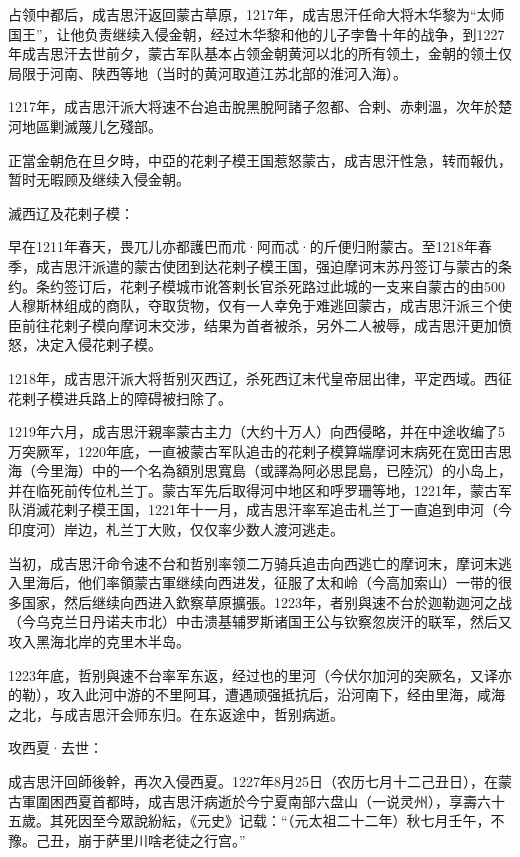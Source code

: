 占领中都后，成吉思汗返回蒙古草原，1217年，成吉思汗任命大将木华黎为“太师国王”，让他负责继续入侵金朝，经过木华黎和他的儿子孛鲁十年的战争，到1227年成吉思汗去世前夕，蒙古军队基本占领金朝黄河以北的所有领土，金朝的领土仅局限于河南、陕西等地（当时的黄河取道江苏北部的淮河入海）。

1217年，成吉思汗派大将速不台追击脫黑脫阿諸子忽都、合剌、赤剌溫，次年於楚河地區剿滅蔑儿乞殘部。

正當金朝危在旦夕時，中亞的花剌子模王国惹怒蒙古，成吉思汗性急，转而報仇，暂时无暇顾及继续入侵金朝。

滅西辽及花剌子模：

早在1211年春天，畏兀儿亦都護巴而朮·阿而忒·的斤便归附蒙古。至1218年春季，成吉思汗派遣的蒙古使团到达花剌子模王国，强迫摩诃末苏丹签订与蒙古的条约。条约签订后，花剌子模城市讹答剌长官杀死路过此城的一支来自蒙古的由500人穆斯林组成的商队，夺取货物，仅有一人幸免于难逃回蒙古，成吉思汗派三个使臣前往花剌子模向摩诃末交涉，结果为首者被杀，另外二人被辱，成吉思汗更加愤怒，决定入侵花剌子模。

1218年，成吉思汗派大将哲别灭西辽，杀死西辽末代皇帝屈出律，平定西域。西征花剌子模进兵路上的障碍被扫除了。

1219年六月，成吉思汗親率蒙古主力（大约十万人）向西侵略，并在中途收编了5万突厥军，1220年底，一直被蒙古军队追击的花剌子模算端摩诃末病死在宽田吉思海（今里海）中的一个名為額別思寬島（或譯為阿必思昆島，已陸沉）的小岛上，并在临死前传位札兰丁。蒙古军先后取得河中地区和呼罗珊等地，1221年，蒙古军队消滅花剌子模王国，1221年十一月，成吉思汗率军追击札兰丁一直追到申河（今印度河）岸边，札兰丁大败，仅仅率少数人渡河逃走。

当初，成吉思汗命令速不台和哲别率领二万骑兵追击向西逃亡的摩诃末，摩诃末逃入里海后，他们率領蒙古軍继续向西进发，征服了太和岭（今高加索山）一带的很多国家，然后继续向西进入欽察草原擴張。1223年，者别與速不台於迦勒迦河之战（今乌克兰日丹诺夫市北）中击溃基辅罗斯诸国王公与钦察忽炭汗的联军，然后又攻入黑海北岸的克里木半岛。

1223年底，哲别與速不台率军东返，经过也的里河（今伏尔加河的突厥名，又译亦的勒），攻入此河中游的不里阿耳，遭遇顽强抵抗后，沿河南下，经由里海，咸海之北，与成吉思汗会师东归。在东返途中，哲别病逝。

攻西夏·去世：

成吉思汗回師後幹，再次入侵西夏。1227年8月25日（农历七月十二己丑日），在蒙古軍圍困西夏首都時，成吉思汗病逝於今宁夏南部六盘山（一说灵州），享壽六十五歲。其死因至今眾說紛紜，《元史》记载：“（元太祖二十二年）秋七月壬午，不豫。己丑，崩于萨里川啥老徒之行宫。”

